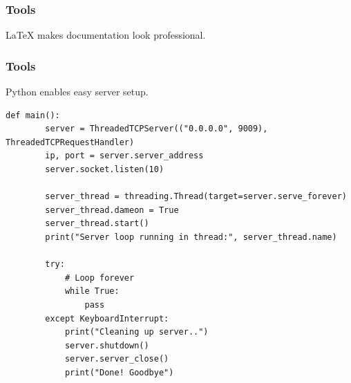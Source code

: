 \documentclass{beamer}
\newcounter{tools}
\begin{document}
\begin{frame}
    \frametitle{Tools }

    \LaTeX{} makes documentation look professional.

    \centering
\end{frame}


\begin{frame}[fragile,c]
    \frametitle{Tools }

    Python enables easy server setup.

    \begin{lstlisting}[style=cpython]
    def main():
        server = ThreadedTCPServer(("0.0.0.0", 9009), ThreadedTCPRequestHandler)
        ip, port = server.server_address
        server.socket.listen(10)

        server_thread = threading.Thread(target=server.serve_forever)
        server_thread.dameon = True
        server_thread.start()
        print("Server loop running in thread:", server_thread.name)

        try:
            # Loop forever
            while True:
                pass
        except KeyboardInterrupt:
            print("Cleaning up server..")
            server.shutdown()
            server.server_close()
            print("Done! Goodbye")

    \end{lstlisting}
\end{frame}
\end{document}
